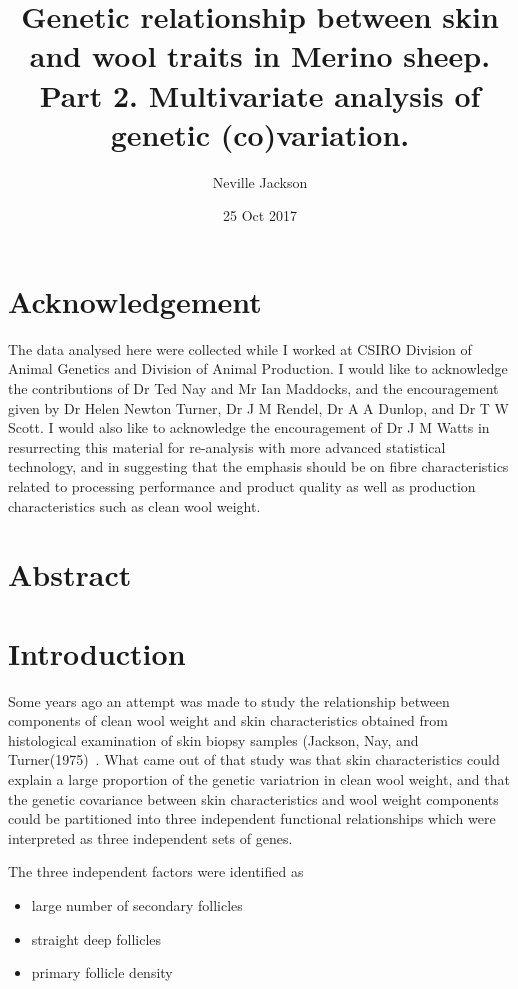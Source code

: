 \documentclass[titlepage]{article}  %
\title{ Genetic relationship between skin and wool traits in Merino sheep. Part 2. Multivariate analysis of genetic (co)variation.}
\author{Neville Jackson }
\date{25 Oct 2017}
\begin{document}
 
 
\maketitle      
\tableofcontents

\clearpage
\section{Acknowledgement}
The data analysed here were collected while I worked at CSIRO Division of Animal Genetics and Division of Animal Production. I would like to acknowledge the contributions of Dr Ted Nay and Mr Ian Maddocks, and the encouragement given by Dr Helen Newton Turner, Dr J M Rendel, Dr A A Dunlop, and Dr T W Scott. I would also like to acknowledge the encouragement of Dr J M Watts in resurrecting this material for re-analysis with more advanced statistical technology, and in suggesting that the emphasis should be on fibre characteristics related to processing performance and product quality as well as production characteristics such as clean wool weight.


\clearpage
\section{Abstract}

\clearpage
\section{Introduction} 
	Some years ago an attempt was made to study the relationship between components of clean wool weight and skin characteristics obtained from histological examination of skin biopsy samples (Jackson, Nay, and Turner(1975)~\cite{jack:75}. What came out of that study was that skin characteristics could explain a large proportion of the genetic variatrion in clean wool weight, and that the genetic covariance between skin characteristics and wool weight components could be partitioned into three independent functional relationships which were interpreted as three independent sets of genes.

	The three independent factors were identified as 
\begin{itemize}
\item large number of secondary follicles
\item straight deep follicles
\item primary follicle density
\end{itemize}
\end{document}
